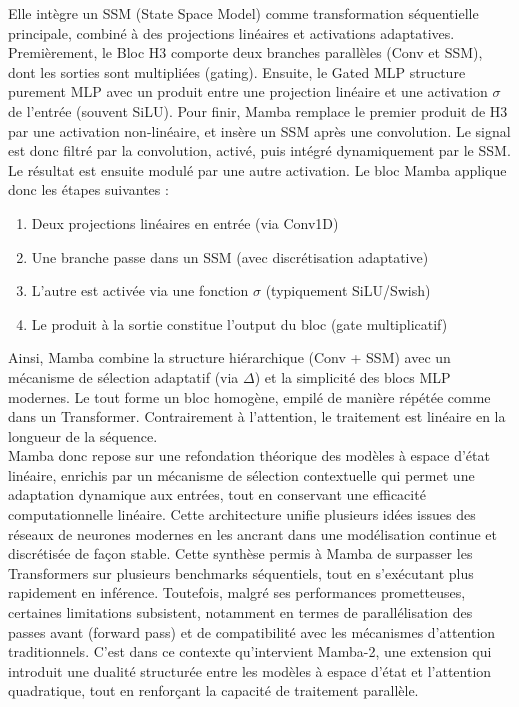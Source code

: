 Elle intègre un SSM (State Space Model) comme transformation séquentielle principale, combiné à des projections linéaires et activations adaptatives. Premièrement, le Bloc H3 comporte deux branches parallèles (Conv et SSM), dont les sorties sont multipliées (gating). Ensuite, le Gated MLP structure purement MLP avec un produit entre une projection linéaire et une activation $\sigma$ de l’entrée (souvent SiLU). Pour finir, Mamba remplace le premier produit de H3 par une activation non-linéaire, et insère un SSM après une convolution. Le signal est donc filtré par la convolution, activé, puis intégré dynamiquement par le SSM. Le résultat est ensuite modulé par une autre activation. Le bloc Mamba applique donc les étapes suivantes :
\begin{enumerate}
    \item Deux projections linéaires en entrée (via Conv1D)
    \item Une branche passe dans un SSM (avec discrétisation adaptative)
    \item L’autre est activée via une fonction $\sigma$ (typiquement SiLU/Swish)
    \item Le produit à la sortie constitue l’output du bloc (gate multiplicatif)
\end{enumerate}

Ainsi, Mamba combine la structure hiérarchique (Conv + SSM) avec un mécanisme de sélection adaptatif (via $\Delta$) et la simplicité des blocs MLP modernes. Le tout forme un bloc homogène, empilé de manière répétée comme dans un Transformer. Contrairement à l’attention, le traitement est linéaire en la longueur de la séquence.\\

Mamba donc repose sur une refondation théorique des modèles à espace d’état linéaire, enrichis par un mécanisme de sélection contextuelle qui permet une adaptation dynamique aux entrées, tout en conservant une efficacité computationnelle linéaire. Cette architecture unifie plusieurs idées issues des réseaux de neurones modernes en les ancrant dans une modélisation continue et discrétisée de façon stable. Cette synthèse permis à Mamba de surpasser les Transformers sur plusieurs benchmarks séquentiels, tout en s'exécutant plus rapidement en inférence. Toutefois, malgré ses performances prometteuses, certaines limitations subsistent, notamment en termes de parallélisation des passes avant (forward pass) et de compatibilité avec les mécanismes d’attention traditionnels. C’est dans ce contexte qu’intervient Mamba-2, une extension  qui introduit une dualité structurée entre les modèles à espace d’état et l’attention quadratique, tout en renforçant la capacité de traitement parallèle. 

